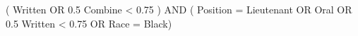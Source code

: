 ( Written  OR 0.5 \ge Combine < 0.75 ) AND 
( Position = Lieutenant OR Oral  OR 0.5 \ge Written < 0.75 OR Race = Black)